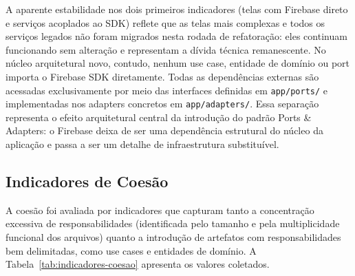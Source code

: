 \documentclass[sigconf,anonymous]{acmart}
\begin{document}
A aparente estabilidade nos dois primeiros indicadores (telas com Firebase direto e serviços acoplados ao SDK) reflete que as telas mais complexas e todos os serviços legados não foram migrados nesta rodada de refatoração: eles continuam funcionando sem alteração e representam a dívida técnica remanescente. No núcleo arquitetural novo, contudo, nenhum use case, entidade de domínio ou port importa o Firebase SDK diretamente. Todas as dependências externas são acessadas exclusivamente por meio das interfaces definidas em \texttt{app/ports/} e implementadas nos adapters concretos em \texttt{app/adapters/}. Essa separação representa o efeito arquitetural central da introdução do padrão Ports \& Adapters: o Firebase deixa de ser uma dependência estrutural do núcleo da aplicação e passa a ser um detalhe de infraestrutura substituível.

\subsection{Indicadores de Coesão}
\label{sec:indicadores-coesao}

A coesão foi avaliada por indicadores que capturam tanto a concentração excessiva de responsabilidades (identificada pelo tamanho e pela multiplicidade funcional dos arquivos) quanto a introdução de artefatos com responsabilidades bem delimitadas, como use cases e entidades de domínio. A Tabela~\ref{tab:indicadores-coesao} apresenta os valores coletados.

\begin{table}[h]
  \caption{Indicadores de coesão coletados nos dois pontos no tempo}
  \label{tab:indicadores-coesao}
\end{table}
\end{document}
